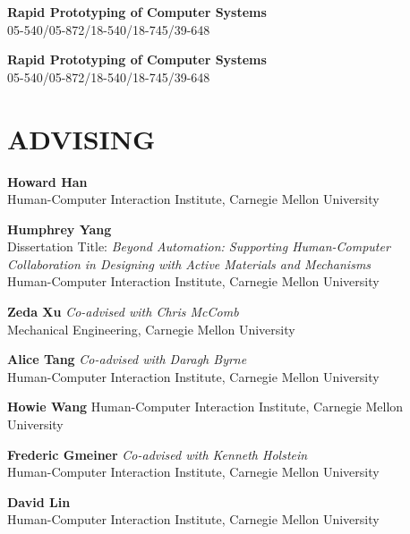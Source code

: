 \documentclass[11pt]{article} %
\begin{document}
 \textbf{Rapid Prototyping of Computer Systems}\\
05-540/05-872/18-540/18-745/39-648\\
\medskip

 \textbf{Rapid Prototyping of Computer Systems}\\
05-540/05-872/18-540/18-745/39-648\\


\section*{\uppercase{Advising}}

 \textbf{Howard Han}\\
Human-Computer Interaction Institute, Carnegie Mellon University
\medskip

 \textbf{Humphrey Yang}\\
Dissertation Title: \textit{Beyond Automation: Supporting Human-Computer Collaboration in Designing with Active Materials and Mechanisms}\\
Human-Computer Interaction Institute, Carnegie Mellon University
\medskip

 \textbf{Zeda Xu} \textit{Co-advised with Chris McComb}\\
Mechanical Engineering, Carnegie Mellon University
\medskip

 \textbf{Alice Tang} \textit{Co-advised with Daragh Byrne}\\
Human-Computer Interaction Institute, Carnegie Mellon University
\medskip


 \textbf{Howie Wang} 
Human-Computer Interaction Institute, Carnegie Mellon University
\medskip

 \textbf{Frederic Gmeiner} \textit{Co-advised with Kenneth Holstein}\\
Human-Computer Interaction Institute, Carnegie Mellon University
\medskip

 \textbf{David Lin}\\
Human-Computer Interaction Institute, Carnegie Mellon University

\end{document}
